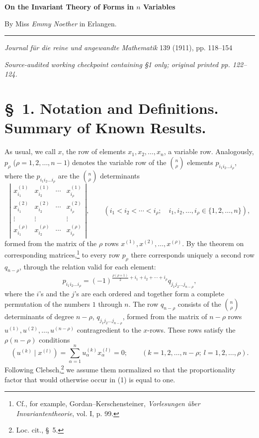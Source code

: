 \documentclass[11pt]{article}
\begin{document}
\begin{center}
{\Large\bfseries On the Invariant Theory of Forms in $n$ Variables}\par
\vspace{0.5em}
By Miss \emph{Emmy Noether} in Erlangen.\par
\medskip
\rule{0.22\linewidth}{0.4pt}\par
\vspace{0.7em}
\emph{Journal f\"ur die reine und angewandte Mathematik} 139 (1911), pp. 118--154
\par\smallskip
{\small\itshape Source-audited working checkpoint containing §1 only; original printed pp. 122--124.}
\end{center}

\section*{\S\ 1. Notation and Definitions. Summary of Known Results.}

As usual, we call $x$, the row of elements $x_1,x_2,\ldots,x_n$, a variable row. Analogously, $p_\rho$ ($\rho=1,2,\ldots,n-1$) denotes the variable row of the $\binom n\rho$ elements $p_{i_1i_2\ldots i_\rho}$, where the $p_{i_1i_2\ldots i_\rho}$ are the $\binom n\rho$ determinants
\[
\left|\begin{array}{cccc}
 x_{i_1}^{(1)}&x_{i_2}^{(1)}&\cdots&x_{i_\rho}^{(1)}\\
 x_{i_1}^{(2)}&x_{i_2}^{(2)}&\cdots&x_{i_\rho}^{(2)}\\
 \vdots&\vdots&&\vdots\\
 x_{i_1}^{(\rho)}&x_{i_2}^{(\rho)}&\cdots&x_{i_\rho}^{(\rho)}
\end{array}\right|,
\qquad (i_1<i_2<\cdots<i_\rho;\quad i_1,i_2,\ldots,i_\rho\in\{1,2,\ldots,n\}),
\]
formed from the matrix of the $\rho$ rows $x^{(1)},x^{(2)},\ldots,x^{(\rho)}$. By the theorem on corresponding matrices,\footnote{Cf., for example, Gordan--Kerschensteiner, \emph{Vorlesungen \"uber Invariantentheorie}, vol. I, p. 99.} to every row $p_\rho$ there corresponds uniquely a second row $q_{n-\rho}$, through the relation valid for each element:
\begin{equation}
 p_{i_1i_2\ldots i_\rho}=(-1)^{\frac{\rho(\rho+1)}{2}+i_1+i_2+\cdots+i_\rho}q_{j_1j_2\ldots j_{n-\rho}},
\tag{1}
\end{equation}
where the $i$'s and the $j$'s are each ordered and together form a complete permutation of the numbers $1$ through $n$. The row $q_{n-\rho}$ consists of the $\binom n\rho$ determinants of degree $n-\rho$,
$q_{j_1j_2\ldots j_{n-\rho}}$, formed from the matrix of $n-\rho$ rows $u^{(1)},u^{(2)},\ldots,u^{(n-\rho)}$ contragredient to the $x$-rows. These rows satisfy the $\rho(n-\rho)$ conditions
\begin{equation}
 (u^{(k)}\mid x^{(l)})=\sum_{\alpha=1}^{n}u_\alpha^{(k)}x_\alpha^{(l)}=0;
 \qquad (k=1,2,\ldots,n-\rho;\ l=1,2,\ldots,\rho).
\tag{2}
\end{equation}
Following Clebsch,\footnote{Loc. cit., \S\ 5.} we assume them normalized so that the proportionality factor that would otherwise occur in (1) is equal to one.
\end{document}
